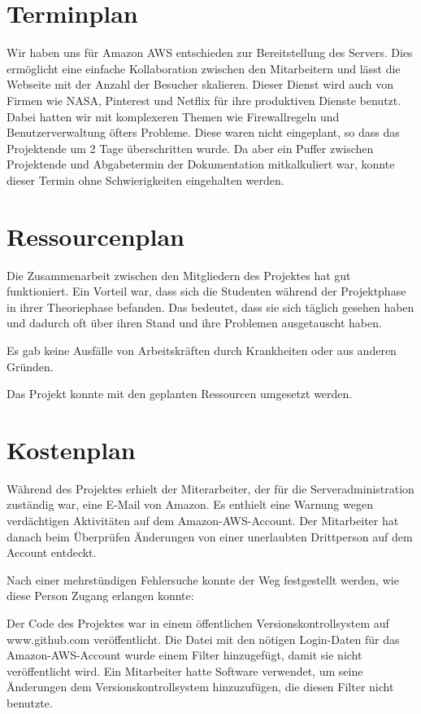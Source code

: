 \documentclass{article}
\begin{document}
\section{Terminplan}
Wir haben uns für Amazon AWS entschieden zur Bereitstellung des Servers. Dies ermöglicht eine einfache Kollaboration zwischen den Mitarbeitern und lässt die Webseite mit der Anzahl der Besucher skalieren. Dieser Dienst wird auch von Firmen wie NASA, Pinterest und Netflix für ihre produktiven Dienste benutzt. Dabei hatten wir mit komplexeren Themen wie Firewallregeln und Benutzerverwaltung öfters Probleme. Diese waren nicht eingeplant, so dass das Projektende um 2 Tage überschritten wurde. Da aber ein Puffer zwischen Projektende und Abgabetermin der Dokumentation mitkalkuliert war, konnte dieser Termin ohne Schwierigkeiten eingehalten werden.


\section{Ressourcenplan}
Die Zusammenarbeit zwischen den Mitgliedern des Projektes hat gut funktioniert. Ein Vorteil war, dass sich die Studenten während der Projektphase in ihrer Theoriephase befanden. Das bedeutet, dass sie sich täglich gesehen haben und dadurch oft über ihren Stand und ihre Problemen ausgetauscht haben.

\smallskip
\noindent Es gab keine Ausfälle von Arbeitskräften durch Krankheiten oder aus anderen Gründen.

\smallskip
\noindent Das Projekt konnte mit den geplanten Ressourcen umgesetzt werden.

\section{Kostenplan}

Während des Projektes erhielt der Miterarbeiter, der für die Serveradministration zuständig war, eine E-Mail von Amazon. Es enthielt eine Warnung wegen verdächtigen Aktivitäten auf dem Amazon-AWS-Account. Der Mitarbeiter hat danach beim Überprüfen Änderungen von einer unerlaubten Drittperson auf dem Account entdeckt.

Nach einer mehrstündigen Fehlersuche konnte der Weg festgestellt werden, wie diese Person Zugang erlangen konnte: 

Der Code des Projektes war in einem öffentlichen Versionskontrollsystem auf www.github.com veröffentlicht. Die Datei mit den nötigen Login-Daten für das Amazon-AWS-Account wurde einem Filter hinzugefügt, damit sie nicht veröffentlicht wird. Ein Mitarbeiter hatte Software verwendet, um seine Änderungen dem Versionskontrollsystem hinzuzufügen, die diesen Filter nicht benutzte.
\end{document}
